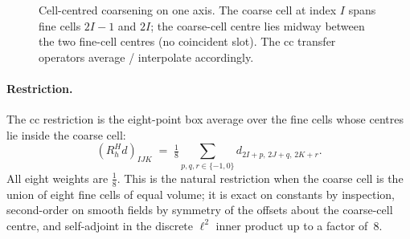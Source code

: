 \documentclass[11pt]{article}
\theoremstyle{definition}
\begin{document}
\begin{figure}[ht]
\centering
{}
\caption{Cell-centred coarsening on one axis.  The coarse cell at
index $I$ spans fine cells $2I{-}1$ and $2I$; the coarse-cell centre
lies midway between the two fine-cell centres (no coincident slot).
The cc transfer operators average / interpolate accordingly.}
\label{fig:cc-coarsening}
\end{figure}

\paragraph{Restriction.}
The cc restriction is the eight-point box average over the fine cells
whose centres lie inside the coarse cell:
\begin{equation}\label{eq:restrict-cc}
  (R_h^H d)_{IJK}
  \;=\; \tfrac{1}{8}\!\!
  \sum_{p,q,r\in\{-1,0\}}\!\! d_{2I+p,\,2J+q,\,2K+r}.
\end{equation}
All eight weights are $\frac{1}{8}$.  This is the natural restriction
when the coarse cell is the union of eight fine cells of equal
volume; it is exact on constants by inspection, second-order on
smooth fields by symmetry of the offsets about the coarse-cell
centre, and self-adjoint in the discrete $\ell^2$ inner product up
to a factor of~$8$.
\end{document}
